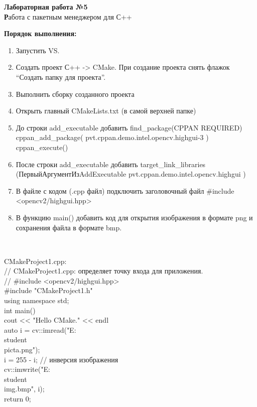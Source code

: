 \begin{center}
\textbf{Лабораторная работа №5}
\\
\textbf Работа с пакетным менеджером для С++
\\
\end{center}
\textbf{Порядок выполнения:} 
\begin{enumerate}
\item Запустить VS.
\item Создать проект С++ -> CMake. При создание проекта снять флажок “Создать папку для проекта”.
\item Выполнить сборку созданного проекта
\item Открыть главный CMakeLists.txt (в самой верхней папке)
\item До строки add\_executable добавить
find\_package(CPPAN REQUIRED)
cppan\_add\_package(
	pvt.cppan.demo.intel.opencv.highgui-3
)
cppan\_execute()
\item После строки
 add\_executable добавить
target\_link\_libraries
(ПервыйАргументИзAddExecutable
	pvt.cppan.demo.intel.opencv.highgui
)
\item В файле с кодом (.cpp файл) подключить заголовочный файл
#include <opencv2/highgui.hpp>
\item В функцию main() добавить код для открытия изображения в формате png и сохранения файла в формате bmp.

 
\\
\end{enumerate}
\newpage
CMakeProject1.cpp:\\
// CMakeProject1.cpp: определяет точку входа для приложения.\\
//
\#include <opencv2/highgui.hpp>\\
\#include "CMakeProject1.h"\\

using namespace std;\\

int main()\\
{
	cout << "Hello CMake." << endl\\
	auto i = cv::imread("E:\\student\\picta.png");\\
	i = 255 - i; // инверсия изображения\\
	cv::imwrite("E:\\student\\img.bmp", i);
\\
	return 0;\\
}



